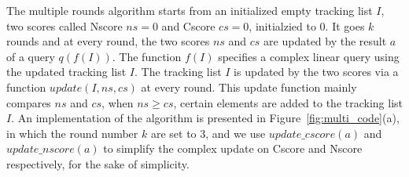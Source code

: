 %
%
%
%
%
%
The multiple rounds algorithm starts from an initialized empty tracking list $I$, two scores called Nscore $ns=0$ and Cscore $cs=0$, initialzied to $0$. It goes $k$ rounds and at every round, the two scores $ns$ and $cs$ are updated by the result $a$ of a query $q(f(I))$. The function $f( I)$ specifies a complex linear query using the updated tracking list $I$. The tracking list $I$ is updated by the two scores via a function $update(I,ns,cs)$ at every round. This update function mainly compares $ns$ and $cs$, when $ns \geq cs$, certain elements are added to the tracking list $I$. An implementation of the algorithm is presented in Figure~\ref{fig:multi_code}(a), in which the round number $k$ are set to $3$, and we use $update\_cscore(a)$ and $update\_nscore(a)$ to simplify the complex update on Cscore and Nscore respectively, for the sake of simplicity.

